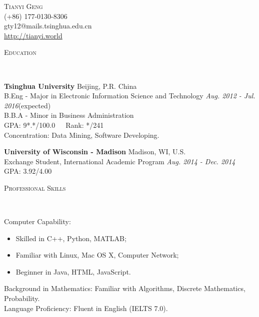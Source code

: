 \documentclass[a4paper, 11pt]{article}
\newenvironment{changemargin}[2]{%
  \begin{list}{}{%
    \setlength{\topsep}{0pt}%
    \setlength{\leftmargin}{#1}%
    \setlength{\rightmargin}{#2}%
    \setlength{\listparindent}{\parindent}%
    \setlength{\itemindent}{\parindent}%
    \setlength{\parsep}{\parskip}%
  }%
  \item[]}{\end{list}
}
\newcommand{\lineover}{
	\begin{changemargin}{-0.05in}{-0.05in}
		\vspace*{-8pt}
		\hrulefill \\
		\vspace*{-2pt}
	\end{changemargin}
}
\newcommand{\header}[1]{
	\begin{changemargin}{-0.5in}{-0.5in}
		\scshape{#1}\\
  	\lineover
	\end{changemargin}
}
\newcommand{\contact}[4]{
	\begin{changemargin}{-0.5in}{-0.5in}
		\begin{center}
			{\Large \scshape {#1}}\\ \smallskip
			{#2}\\ \smallskip 
			{#3}\\ \smallskip
			{#4}\smallskip
		\end{center}
	\end{changemargin}
}
\newenvironment{body} {
	\vspace*{-16pt}
	\begin{changemargin}{-0.25in}{-0.5in}
  }	
	{\end{changemargin}
}
\begin{document}
\contact{Tianyi Geng}{(+86) 177-0130-8306}{gty12@mails.tsinghua.edu.cn}{\href{http://tianyi.world}{http://tianyi.world}}

\header{Education}

\begin{body}
	\vspace{14pt}

	\textbf{Tsinghua University} \hfill Beijing, P.R. China \\
B.Eng - Major in Electronic Information Science and Technology  \hfill \emph{Aug. 2012 - Jul. 2016}(expected){} \\
B.B.A - Minor in Business Administration \\
GPA: 9*.*/100.0\ \ \ Rank: */241\\
Concentration: Data Mining, Software Developing. \\
\vspace{5pt}


	\textbf{University of Wisconsin - Madison} \hfill Madison, WI, U.S. \\
	Exchange Student, International Academic Program \hfill \emph{Aug. 2014 - Dec. 2014}{} \\
GPA: 3.92/4.00\\


\end{body}

\smallskip

\header{Professional Skills}

\begin{body}
	\vspace{14pt}
	Computer Capability: 
	\begin{itemize}
	\itemsep 0pt
	\item Skilled in C++, Python, MATLAB;
	\item Familiar with Linux, Mac OS X, Computer Network;
	\item Beginner in Java, HTML, JavaScript.
	\end{itemize}
	Background in Mathematics: Familiar with Algorithms, Discrete Mathematics, Probability.\\
\smallskip
	Language Proficiency: Fluent in English (IELTS 7.0).\\
\end{body}
\smallskip
\end{document}
